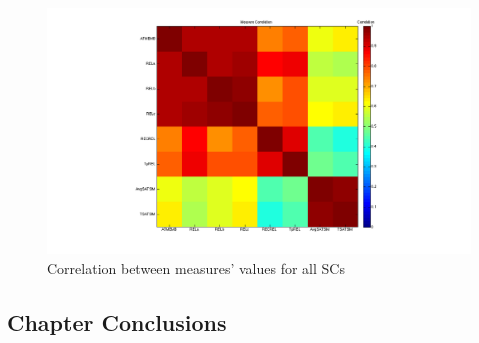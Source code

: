 \documentclass{article}
\begin{document}
\begin{figure}[htb]
\centering
\includegraphics[width=.9\linewidth]{../plots/Measure_Correlation_All.png}
\caption{\label{fig:measurecorrall}Correlation between measures' values for all SCs}
\end{figure}
\subsection{Chapter Conclusions}
\label{sec-7-9}
\end{document}
